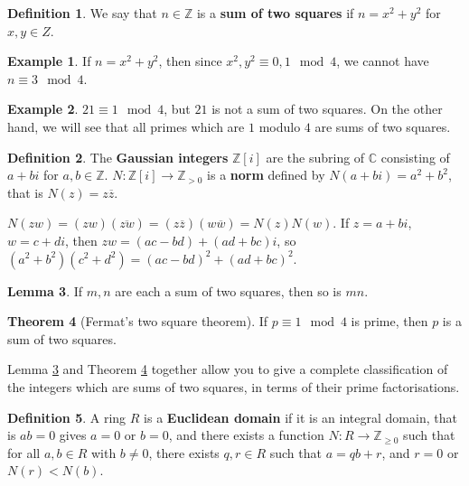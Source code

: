 \documentclass{article}
\newcommand{\Z}{\mathbb{Z}}
\newcommand{\C}{\mathbb{C}}
\newcommand{\rb}[1]{\left( #1 \right)}
\renewcommand{\sb}[1]{\left[ #1 \right]}
\theoremstyle{definition}\newtheorem{definition}{Definition}
\theoremstyle{definition}\newtheorem*{remark}{Remark}
\theoremstyle{definition}\newtheorem*{example}{Example}
\theoremstyle{definition}\newtheorem*{note}{Note}
\newtheorem{lemma}[definition]{Lemma}
\newtheorem{theorem}[definition]{Theorem}
\begin{document}
\begin{definition}
We say that $ n \in \Z $ is a \textbf{sum of two squares} if $ n = x^2 + y^2 $ for $ x, y \in Z $.
\end{definition}

\begin{example}
If $ n = x^2 + y^2 $, then since $ x^2, y^2 \equiv 0, 1 \mod 4 $, we cannot have $ n \equiv 3 \mod 4 $.
\end{example}

\begin{example}
$ 21 \equiv 1 \mod 4 $, but $ 21 $ is not a sum of two squares. On the other hand, we will see that all primes which are $ 1 $ modulo $ 4 $ are sums of two squares.
\end{example}

\begin{definition}
The \textbf{Gaussian integers} $ \Z\sb{i} $ are the subring of $ \C $ consisting of $ a + bi $ for $ a, b \in \Z $. $ N : \Z\sb{i} \to \Z_{> 0} $ is a \textbf{norm} defined by $ N\rb{a + bi} = a^2 + b^2 $, that is $ N\rb{z} = z\overline{z} $.
\end{definition}

$ N\rb{zw} = \rb{zw}\rb{\overline{zw}} = \rb{z\overline{z}}\rb{w\overline{w}} = N\rb{z}N\rb{w} $. If $ z = a + bi $, $ w = c + di $, then $ zw = \rb{ac - bd} + \rb{ad + bc}i $, so $ \rb{a^2 + b^2}\rb{c^2 + d^2} = \rb{ac - bd}^2 + \rb{ad + bc}^2 $.

\begin{lemma}
\label{lem:46}
If $ m, n $ are each a sum of two squares, then so is $ mn $.
\end{lemma}

\begin{theorem}[Fermat's two square theorem]
\label{thm:47}
If $ p \equiv 1 \mod 4 $ is prime, then $ p $ is a sum of two squares.
\end{theorem}

Lemma \ref{lem:46} and Theorem \ref{thm:47} together allow you to give a complete classification of the integers which are sums of two squares, in terms of their prime factorisations.

\begin{definition}
A ring $ R $ is a \textbf{Euclidean domain} if it is an integral domain, that is $ ab = 0 $ gives $ a = 0 $ or $ b = 0 $, and there exists a function $ N : R \to \Z_{\ge 0} $ such that for all $ a, b \in R $ with $ b \ne 0 $, there exists $ q, r \in R $ such that $ a = qb + r $, and $ r = 0 $ or $ N\rb{r} < N\rb{b} $.
\end{definition}
\end{document}
